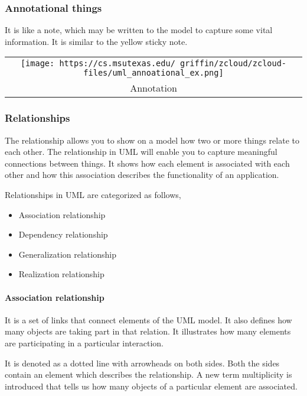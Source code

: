 \documentclass[
]{article}
\providecommand{\tightlist}{%
  \setlength{\itemsep}{0pt}\setlength{\parskip}{0pt}}
\begin{document}
\hypertarget{annotational-things}{%
\subsubsection{Annotational things}\label{annotational-things}}

It is like a note, which may be written to the model to capture some
vital information. It is similar to the yellow sticky note.

\begin{longtable}[]{@{}c@{}}
\toprule
\endhead
\texttt{[image: https://cs.msutexas.edu/~griffin/zcloud/zcloud-files/uml\_annoational\_ex.png]}\tabularnewline
Annotation\tabularnewline
\bottomrule
\end{longtable}

\hypertarget{relationships}{%
\subsubsection{Relationships}\label{relationships}}

The relationship allows you to show on a model how two or more things
relate to each other. The relationship in UML will enable you to capture
meaningful connections between things. It shows how each element is
associated with each other and how this association describes the
functionality of an application.

Relationships in UML are categorized as follows,

\begin{itemize}
\tightlist
\item
  Association relationship
\item
  Dependency relationship
\item
  Generalization relationship
\item
  Realization relationship
\end{itemize}

\hypertarget{association-relationship}{%
\paragraph{Association relationship}\label{association-relationship}}

It is a set of links that connect elements of the UML model. It also
defines how many objects are taking part in that relation. It
illustrates how many elements are participating in a particular
interaction.

It is denoted as a dotted line with arrowheads on both sides. Both the
sides contain an element which describes the relationship. A new term
multiplicity is introduced that tells us how many objects of a
particular element are associated.
\end{document}
